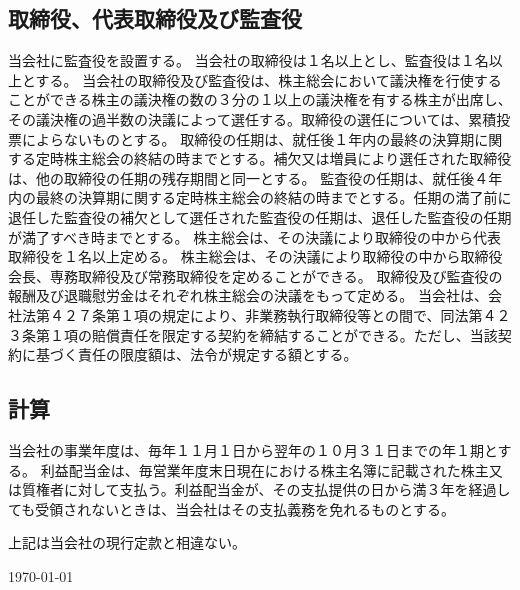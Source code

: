 \documentclass[10pt,a4paper,uplatex]{jsarticle}
\begin{document}
\subsection{取締役、代表取締役及び監査役}
当会社に監査役を設置する。
当会社の取締役は１名以上とし、監査役は１名以上とする。
当会社の取締役及び監査役は、株主総会において議決権を行使することができる株主の議決権の数の３分の１以上の議決権を有する株主が出席し、その議決権の過半数の決議によって選任する。取締役の選任については、累積投票によらないものとする。
取締役の任期は、就任後１年内の最終の決算期に関する定時株主総会の終結の時までとする。補欠又は増員により選任された取締役は、他の取締役の任期の残存期間と同一とする。
監査役の任期は、就任後４年内の最終の決算期に関する定時株主総会の終結の時までとする。任期の満了前に退任した監査役の補欠として選任された監査役の任期は、退任した監査役の任期が満了すべき時までとする。
株主総会は、その決議により取締役の中から代表取締役を１名以上定める。
\term 株主総会は、その決議により取締役の中から取締役会長、専務取締役及び常務取締役を定めることができる。
取締役及び監査役の報酬及び退職慰労金はそれぞれ株主総会の決議をもって定める。
当会社は、会社法第４２７条第１項の規定により、非業務執行取締役等との間で、同法第４２３条第１項の賠償責任を限定する契約を締結することができる。ただし、当該契約に基づく責任の限度額は、法令が規定する額とする。

\subsection{計算}
当会社の事業年度は、毎年１１月１日から翌年の１０月３１日までの年１期とする。
利益配当金は、毎営業年度末日現在における株主名簿に記載された株主又は質権者に対して支払う。利益配当金が、その支払提供の日から満３年を経過しても受領されないときは、当会社はその支払義務を免れるものとする。


\vspace{20pt}
上記は当会社の現行定款と相違ない。
\begin{flushleft} 
\today\\
\vspace{10pt}
\MakeSignatureField
\end{flushleft}
\end{document}

